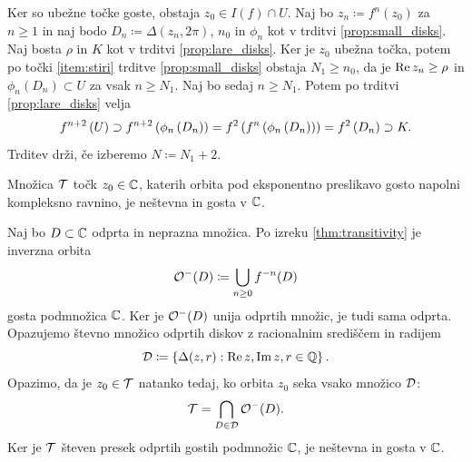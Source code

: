 \begin{dokaz}
    Ker so ubežne točke goste, obstaja \(z_0 \in I (f) \cap U\). Naj bo \(z_n \coloneq f^n (z_0)\) za \(n \geq 1\) in naj bodo \(D_n \coloneq \Delta (z_n, 2 \pi)\), \(n_0\) in \(\phi_n\) kot v trditvi \ref{prop:small_disks}. Naj bosta \(\rho\) in \(K\) kot v trditvi \ref{prop:lare_disks}. Ker je \(z_0\) ubežna točka, potem po točki \ref{item:stiri} trditve \ref{prop:small_disks} obstaja \(N_1 \geq n_0\), da je \(\operatorname{Re} z_n \geq \rho\) in \(\phi_n (D_n) \subset U\) za vsak \(n \geq N_1\). Naj bo sedaj \(n \geq N_1\). Potem po trditvi \ref{prop:lare_disks} velja
    \[f^{n + 2} \left( U \right) \supset f^{n + 2} \left( \phi_n \left( D_n \right) \right) = f^2 \left( f^n \left( \phi_n \left( D_n \right) \right) \right) = f^2 \left( D_n \right) \supset K.\]
    Trditev drži, če izberemo \(N \coloneq N_1 + 2\).
\end{dokaz}

\begin{posledica}
    Množica \(\mathcal T\) točk \(z_0 \in \mathbb C\), katerih orbita pod eksponentno preslikavo gosto napolni kompleksno ravnino, je neštevna in gosta v \(\mathbb C\).
\end{posledica}

\begin{dokaz}
    Naj bo \(D \subset \mathbb C\) odprta in neprazna množica. Po izreku \ref{thm:transitivity} je inverzna orbita
    \[\mathcal O^- (D) \coloneq \bigcup_{n \geq 0} f^{- n} (D)\]
    gosta podmnožica \(\mathbb C\). Ker je \(\mathcal O^- (D)\) unija odprtih množic, je tudi sama odprta. Opazujemo števno množico odprtih diskov z racionalnim središčem in radijem
    \[\mathcal D \coloneq \left\{ \Delta (z, r) : \operatorname{Re} z, \operatorname{Im} z, r \in \mathbb Q \right\}.\]
    Opazimo, da je \(z_0 \in \mathcal T\) natanko tedaj, ko orbita \(z_0\) seka vsako množico \(\mathcal D\):
    \[\mathcal T = \bigcap_{D \in \mathcal D} \mathcal O^- (D).\]
    Ker je \(\mathcal T\) števen presek odprtih gostih podmnožic \(\mathbb C\), je neštevna in gosta v \(\mathbb C\).
\end{dokaz}